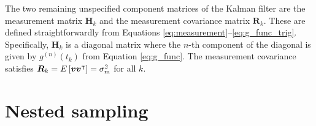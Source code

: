 \documentclass[fleqn,usenatbib,useAMS]{mnras}
\begin{document}
The two remaining unspecified component matrices of the Kalman filter are the measurement matrix $\boldsymbol{H}_k$ and the measurement covariance matrix $\boldsymbol{R}_k$. These are defined straightforwardly from Equations \eqref{eq:measurement}--\eqref{eq:g_func_trig}. Specifically, 
$\boldsymbol{H}_k$ is a diagonal matrix where the $n$-th component of the diagonal is given by $g^{(n)}(t_k)$ from Equation \eqref{eq:g_func}. The measurement covariance satisfies $\boldsymbol{R}_k = E \left[ \boldsymbol{v} \boldsymbol{v}^\intercal \right] = \sigma^2_{\rm m}$ for all $k$.





\section{Nested sampling}\label{sec:nested_sampling}
\end{document}
